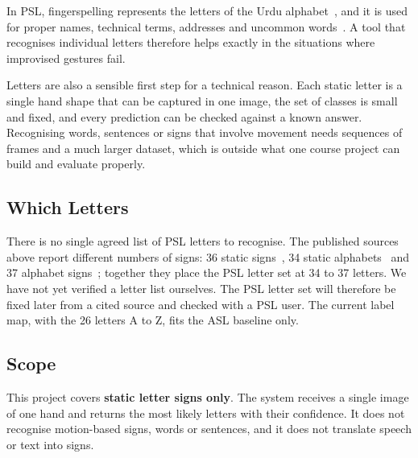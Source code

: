 In PSL, fingerspelling represents the letters of the Urdu alphabet~\cite{colorglove_psl}, and it is used for proper names, technical terms, addresses and uncommon words~\cite{pslcfrt}. A tool that recognises individual letters therefore helps exactly in the situations where improvised gestures fail.

Letters are also a sensible first step for a technical reason. Each static letter is a single hand shape that can be captured in one image, the set of classes is small and fixed, and every prediction can be checked against a known answer. Recognising words, sentences or signs that involve movement needs sequences of frames and a much larger dataset, which is outside what one course project can build and evaluate properly.

\subsection{Which Letters}

There is no single agreed list of PSL letters to recognise. The published sources above report different numbers of signs: 36 static signs~\cite{sajid2025ualpha40}, 34 static alphabets~\cite{colorglove_psl} and 37 alphabet signs~\cite{butt_psl_kaggle}; together they place the PSL letter set at 34 to 37 letters. We have not yet verified a letter list ourselves. The PSL letter set will therefore be fixed later from a cited source and checked with a PSL user. The current label map, with the 26 letters A to Z, fits the ASL baseline only.

\subsection{Scope}

This project covers \textbf{static letter signs only}. The system receives a single image of one hand and returns the most likely letters with their confidence. It does not recognise motion-based signs, words or sentences, and it does not translate speech or text into signs.
